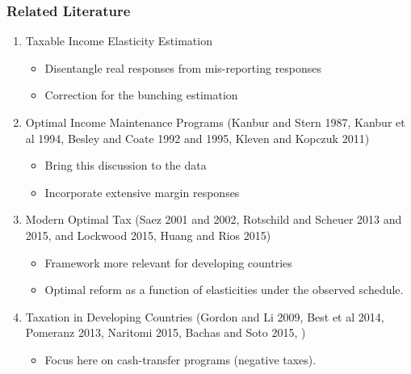 \documentclass[xcolor=pdftex,dvipsnames,table]{beamer}
\begin{document}
\appendix
{}
\setcounter{finalframe}{\value{framenumber}}

\begin{frame}[label=literature]
 \frametitle{Related Literature}
\begin{enumerate}
\item Taxable Income Elasticity Estimation
\begin{itemize}
\item Disentangle real responses from mis-reporting responses
\item Correction for the bunching estimation
\end{itemize}
\item Optimal Income Maintenance Programs (Kanbur and Stern 1987, Kanbur et al 1994, Besley and Coate 1992 and 1995, Kleven and Kopczuk 2011)
\begin{itemize}
\item Bring this discussion to the data 
\item Incorporate extensive margin responses
\end{itemize}
\item Modern Optimal Tax (Saez 2001 and 2002, Rotschild and Scheuer 2013 and 2015,  and Lockwood 2015, Huang and Rios 2015)
\begin{itemize}
\item Framework more relevant for developing countries 
\item Optimal reform as a function of elasticities under the observed schedule.
\end{itemize}
\item Taxation in Developing Countries (Gordon and Li 2009, Best et al 2014, Pomeranz 2013, Naritomi 2015, Bachas and Soto 2015, )
\begin{itemize}
\item Focus here on cash-transfer programs (negative taxes).
\end{itemize}
\end{enumerate}
\hyperlink{question}{}
\end{frame}
\end{document}
